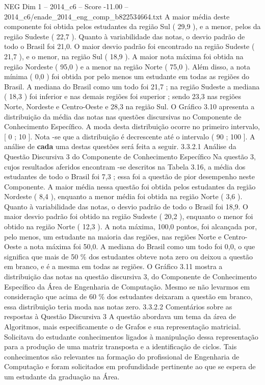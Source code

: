 \begin{textsample}{NEG Dim 1 – 2014\_c6 – Score -11.00 – 2014\_c6/enade\_2014\_eng\_comp\_b822534664.txt}
A maior média deste componente foi obtida pelos estudantes da região Sul ( 29,9 ), e a menor, pelos da região Sudeste ( 22,7 ).
Quanto à variabilidade das notas, o desvio padrão de todo o Brasil foi 21,0.
O maior desvio padrão foi encontrado na região Sudeste ( 21,7 ), e o menor, na região Sul ( 18,9 ).
A maior nota máxima foi obtida na região Nordeste ( 95,0 ) e a menor na região Norte ( 75,0 ).
Além disso, a nota mínima ( 0,0 ) foi obtida por pelo menos um estudante em todas as regiões do Brasil.
A mediana do Brasil como um todo foi 21,7 ; na região Sudeste a mediana ( 18,3 ) foi inferior e nas demais regiões foi superior ; sendo 23,3 nas regiões Norte, Nordeste e Centro-Oeste e 28,3 na região Sul.
O Gráfico 3.10 apresenta a distribuição da média das notas nas questões discursivas no Componente de Conhecimento Específico.
A moda desta distribuição ocorre no primeiro intervalo, [ 0 ; 10 ].
Nota -se que a distribuição é decrescente até o intervalo ( 90 ; 100 ].
A análise de \textbf{cada} uma destas questões será feita a seguir. 3.3.2.1 Análise da Questão Discursiva 3 do Componente de Conhecimento Específico Na questão 3, cujos resultados aferidos encontram -se descritos na Tabela 3.16, a média dos estudantes de todo o Brasil foi 7,3 ; essa foi a questão de pior desempenho neste Componente.
A maior média nessa questão foi obtida pelos estudantes da região Nordeste ( 8,4 ), enquanto a menor média foi obtida na região Norte ( 3,6 ).
Quanto à variabilidade das notas, o desvio padrão de todo o Brasil foi 18,9.
O maior desvio padrão foi obtido na região Sudeste ( 20,2 ), enquanto o menor foi obtido na região Norte ( 12,3 ).
A nota máxima, 100,0 pontos, foi alcançada por, pelo menos, um estudante na maioria das regiões, nas regiões Norte e Centro-Oeste a nota máxima foi 50,0.
A mediana do Brasil como um todo foi 0,0, o que significa que mais de 50 \% dos estudantes obteve nota zero ou deixou a questão em branco, e é a mesma em todas as regiões.
O Gráfico 3.11 mostra a distribuição das notas na questão discursiva 3, do Componente de Conhecimento Específico da Área de Engenharia de Computação.
Mesmo se não levarmos em consideração que acima de 60 \% dos estudantes deixaram a questão em branco, essa distribuição teria moda nas notas zero. 3.3.2.2 Comentários sobre as respostas à Questão Discursiva 3 A questão abordava um tema da área de Algoritmos, mais especificamente o de Grafos e sua representação matricial.
Solicitava do estudante conhecimentos ligados à manipulação dessa representação para a produção de uma matriz transposta e a identificação de ciclos.
Tais conhecimentos são relevantes na formação do profissional de Engenharia de Computação e foram solicitados em profundidade pertinente ao que se espera de um estudante da graduação na Área.

\end{textsample}
